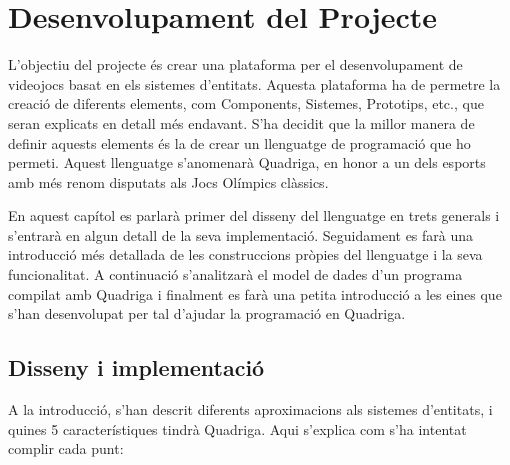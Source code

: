 \chapter{Desenvolupament del Projecte}

L'objectiu del projecte és crear una plataforma per el desenvolupament de videojocs basat en els sistemes d'entitats. Aquesta plataforma ha de permetre la creació de diferents elements, com Components, Sistemes, Prototips, etc., que seran explicats en detall més endavant.
S'ha decidit que la millor manera de definir aquests elements és la de crear un llenguatge de programació que ho permeti. Aquest llenguatge s'anomenarà Quadriga, en honor a un dels esports amb més renom disputats als Jocs Olímpics clàssics.

En aquest capítol es parlarà primer del disseny del llenguatge en trets generals i s'entrarà en algun detall de la seva implementació. Seguidament es farà una introducció més detallada de les construccions pròpies del llenguatge i la seva funcionalitat. A continuació s'analitzarà el model de dades d'un programa compilat amb Quadriga i finalment es farà una petita introducció a les eines que s'han desenvolupat per tal d'ajudar la programació en Quadriga.

\section{Disseny i implementació}

  A la introducció, s'han descrit diferents aproximacions als sistemes d'entitats, i quines 5 característiques tindrà Quadriga. Aqui s'explica com s'ha intentat complir cada punt:

